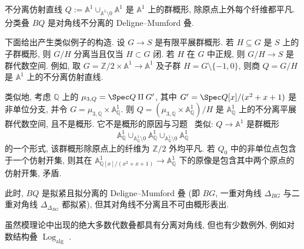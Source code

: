 \begin{example}\label{src:4.9.38}
不分离仿射直线 $Q:=\mathbb A^1\cup_{\mathbb A^1\setminus0}\mathbb A^1$ 是 $\mathbb A^1$ 上的群概形, 除原点上外每个纤维都平凡. 分类叠 $BQ$ 是对角线不分离的 Deligne--Mumford 叠.

下面给出产生类似例子的构造. 设 $G\to S$ 是有限平展群概形. 若 $H\subseteq G$ 是 $S$ 上的子群概形, 则 $G/H$ 分离当且仅当 $H\subset G$ 闭. 若 $H$ 在 $G$ 中正规, 则 $G/H\to S$ 是群代数空间. 例如, 取 $G=\mathbb Z/2\times\mathbb A^1\to\mathbb A^1$ 及子群 $H=G\setminus\{-1,0\}$, 则商 $Q=G/H$ 是 $\mathbb A^1$ 上的不分离仿射直线.

类似地, 考虑 $\mathbb Q$ 上的 $\mu_{3,\mathbb Q}=\Spec\mathbb Q\amalg G'$, 其中 $G'=\Spec\mathbb Q[x]/(x^2+x+1)$ 是非单位分支, 并令 $G=\mu_{3,\mathbb Q}\times\mathbb A^1_{\mathbb Q}$. 则 $Q=(\mu_{3,\mathbb Q}\times\mathbb A^1_{\mathbb Q})/H$ 是 $\mathbb A^1_{\mathbb Q}$ 上的不分离平展群代数空间, 且不是概形. 它不是概形的原因与习题~ 类似: $Q\to\mathbb A^1$ 是群概形
\[
\mathbb A^1_{\mathbb Q}\cup_{\mathbb A^1_{\mathbb Q}\setminus0}
\mathbb A^1_{\mathbb Q}\cup_{\mathbb A^1_{\mathbb Q}\setminus0}\mathbb A^1_{\mathbb Q}
\]
的一个形式, 该群概形除原点上的纤维为 $\mathbb Z/2$ 外均平凡. 若 $Q_0$ 中的非单位点包含于一个仿射开集, 则其在 $\mathbb A^1_{\mathbb Q[x]/(x^2+x+1)}\to\mathbb A^1_{\mathbb Q}$ 下的原像是包含其中两个原点的仿射开集, 矛盾.

此时, $BQ$ 是拟紧且拟分离的 Deligne--Mumford 叠 (即 $BG$, 一重对角线 $\Delta_{BG}$ 与二重对角线 $\Delta_{\Delta_{BG}}$ 都拟紧), 但其对角线不分离且不可由概形表出.
\end{example}
虽然模理论中出现的绝大多数代数叠都具有分离对角线, 但也有少数例外, 例如对数结构叠 $\operatorname{Log}_{\mathrm{alg}}$ \cite{Ols03}.
\par\clearpage
\endgroup
